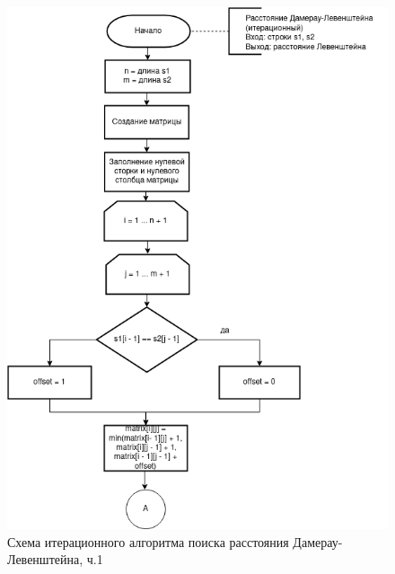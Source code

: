 \documentclass[12pt]{report}
\begin{document}
	\begin{figure}[H]
		\centering
		\includegraphics[width=0.8\linewidth]{DamLev_1}
		\caption{Схема итерационного алгоритма поиска расстояния Дамерау-Левенштейна, ч.1}
		\label{fig:schema_bucket_2}
	\end{figure}
	
\end{document}
